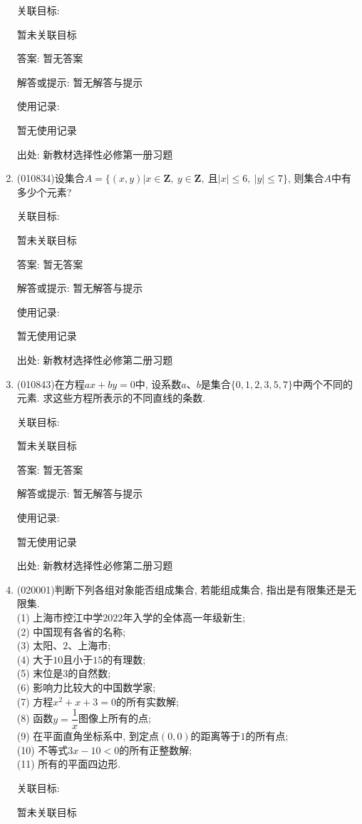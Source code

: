 \documentclass[10pt,a4paper]{article}
\begin{document}
\begin{enumerate}[1.]
关联目标:

暂未关联目标

答案: 暂无答案

解答或提示: 暂无解答与提示

使用记录:

暂无使用记录


出处: 新教材选择性必修第一册习题
\item { (010834)}设集合$A=\{(x, y)|x\in \mathbf{Z}, \  y\in \mathbf{Z}, \  \text{且}|x|\le 6, \ |y|\le 7\}$, 则集合$A$中有多少个元素?


关联目标:

暂未关联目标

答案: 暂无答案

解答或提示: 暂无解答与提示

使用记录:

暂无使用记录


出处: 新教材选择性必修第二册习题
\item { (010843)}在方程$ax+by=0$中, 设系数$a$、$b$是集合$\{0, 1, 2, 3, 5, 7\}$中两个不同的元素. 求这些方程所表示的不同直线的条数.


关联目标:

暂未关联目标

答案: 暂无答案

解答或提示: 暂无解答与提示

使用记录:

暂无使用记录


出处: 新教材选择性必修第二册习题
\item { (020001)}判断下列各组对象能否组成集合, 若能组成集合, 指出是有限集还是无限集.\\
(1) 上海市控江中学$2022$年入学的全体高一年级新生;\\
(2) 中国现有各省的名称;\\
(3) 太阳、$2$、上海市;\\
(4) 大于$10$且小于$15$的有理数;\\
(5) 末位是$3$的自然数;\\
(6) 影响力比较大的中国数学家;\\
(7) 方程$x^2+x+3=0$的所有实数解;\\ 
(8) 函数$y=\dfrac 1x$图像上所有的点;\\ 
(9) 在平面直角坐标系中, 到定点$(0, 0)$的距离等于$1$的所有点;\\
(10) 不等式$3x-10<0$的所有正整数解;\\
(11) 所有的平面四边形.


关联目标:

暂未关联目标


\end{enumerate}
\end{document}
